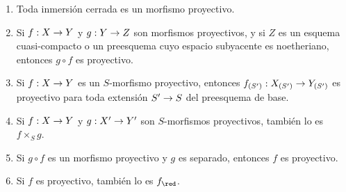 \documentclass[oneside,10pt]{amsart}
\makeatletter
\newcommand{\ega@arrow}[2]{\mathchoice{#1}{#2}{#2}{#2}}
\renewcommand{\to}{\ega@arrow{\longrightarrow}{\rightarrow}}
\let\EGAOriginalLabel\label
\renewcommand{\label}[1]{\phantomsection\EGAOriginalLabel{#1}}
\makeatother
\begin{document}
\begin{proposition}[5.5.5]
\label{II.5.5.5}
\medskip\noindent
\begin{enumerate}
  \item[{\rm(i)}] Toda inmersión cerrada es un morfismo proyectivo.
  \item[{\rm(ii)}] Si $f:X\to Y$ y $g:Y\to Z$ son morfismos proyectivos, y si $Z$ es un esquema cuasi-compacto o un preesquema cuyo espacio subyacente es noetheriano, entonces $g\circ f$ es proyectivo.
  \item[{\rm(iii)}] Si $f:X\to Y$ es un $S$-morfismo proyectivo, entonces $f_{(S')}:X_{(S')}\to Y_{(S')}$ es proyectivo para toda extensión $S'\to S$ del preesquema de base.
  \item[{\rm(iv)}] Si $f:X\to Y$ y $g:X'\to Y'$ son $S$-morfismos proyectivos, también lo es $f\times_S g$.
  \item[{\rm(v)}] Si $g\circ f$ es un morfismo proyectivo y $g$ es separado, entonces $f$ es proyectivo.
  \item[{\rm(vi)}] Si $f$ es proyectivo, también lo es $f_\red$.
\end{enumerate}
\end{proposition}
\end{document}
